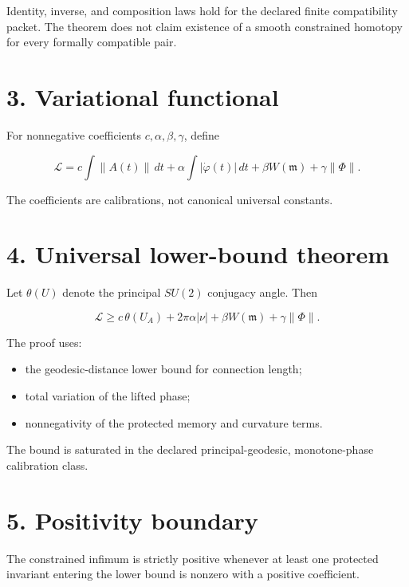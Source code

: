 Identity, inverse, and composition laws hold for the declared finite compatibility packet. The theorem does not claim existence of a smooth constrained homotopy for every formally compatible pair.

\hypertarget{variational-functional}{%
\section{3. Variational functional}\label{variational-functional}}

For nonnegative coefficients \(c,\alpha,\beta,\gamma\), define

\[
\mathcal L
=c\int\|A(t)\|\,dt
+\alpha\int|\dot\varphi(t)|\,dt
+\beta W(\mathfrak m)
+\gamma\|\Phi\|.
\]

The coefficients are calibrations, not canonical universal constants.

\hypertarget{universal-lower-bound-theorem}{%
\section{4. Universal lower-bound theorem}\label{universal-lower-bound-theorem}}

Let \(\theta(U)\) denote the principal \(SU(2)\) conjugacy angle. Then

\[
\boxed{
\mathcal L
\ge
c\,\theta(U_A)
+2\pi\alpha|\nu|
+\beta W(\mathfrak m)
+\gamma\|\Phi\|.
}
\]

The proof uses:

\begin{itemize}
\tightlist
\item
  the geodesic-distance lower bound for connection length;
\item
  total variation of the lifted phase;
\item
  nonnegativity of the protected memory and curvature terms.
\end{itemize}

The bound is saturated in the declared principal-geodesic, monotone-phase calibration class.

\hypertarget{positivity-boundary}{%
\section{5. Positivity boundary}\label{positivity-boundary}}

The constrained infimum is strictly positive whenever at least one protected invariant entering the lower bound is nonzero with a positive coefficient.

